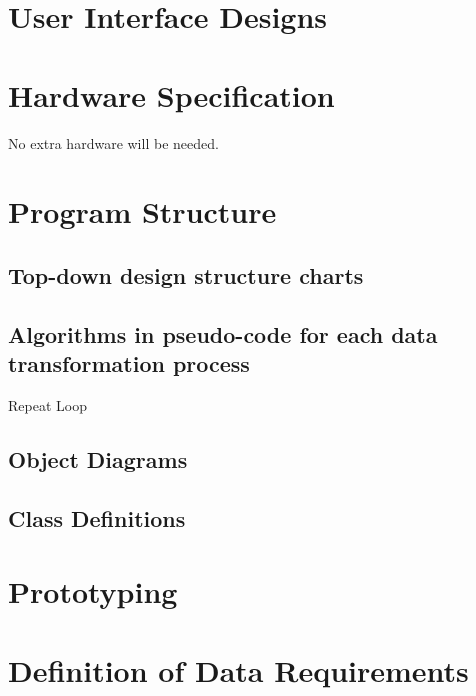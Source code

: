\section{User Interface Designs}

\section{Hardware Specification}
No extra hardware will be needed.

\section{Program Structure}

\subsection{Top-down design structure charts}

\subsection{Algorithms in pseudo-code for each data transformation process}

\begin{algorithm}[H]
\label{fig:repeat_pseudo_example}
    \caption{Repeat Loop}
\begin{algorithmic}[1]
\State
\Repeat
\end{algorithmic}
\end{algorithm}

\subsection{Object Diagrams}

\subsection{Class Definitions}

\section{Prototyping}

\section{Definition of Data Requirements}

